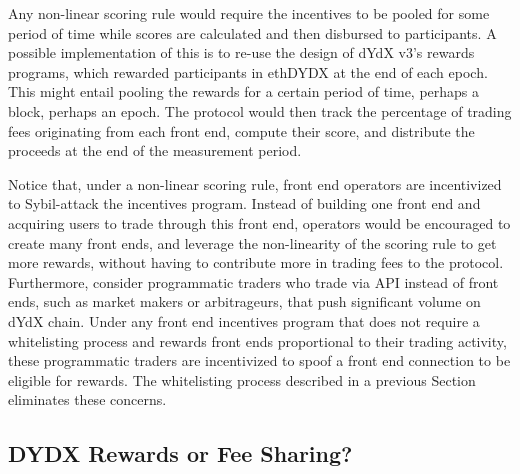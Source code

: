         Any non-linear scoring rule would require the incentives to be pooled for some period of time while scores are calculated and then disbursed to participants. A possible implementation of this is to re-use the design of dYdX v3's rewards programs, which rewarded participants in ethDYDX at the end of each epoch. This might entail pooling the rewards for a certain period of time, perhaps a block, perhaps an epoch. The protocol would then track the percentage of trading fees originating from each front end, compute their score, and distribute the proceeds at the end of the measurement period.

        Notice that, under a non-linear scoring rule, front end operators are incentivized to Sybil-attack the incentives program. Instead of building one front end and acquiring users to trade through this front end, operators would be encouraged to create many front ends, and leverage the non-linearity of the scoring rule to get more rewards, without having to contribute more in trading fees to the protocol.
        Furthermore, consider programmatic traders who trade via API instead of front ends, such as market makers or arbitrageurs, that push significant volume on dYdX chain. Under any front end incentives program that does not require a whitelisting process and rewards front ends proportional to their trading activity, these programmatic traders are incentivized to spoof a front end connection to be eligible for rewards. The whitelisting process described in a previous Section eliminates these concerns.
        
    \subsection{DYDX Rewards or Fee Sharing?}

